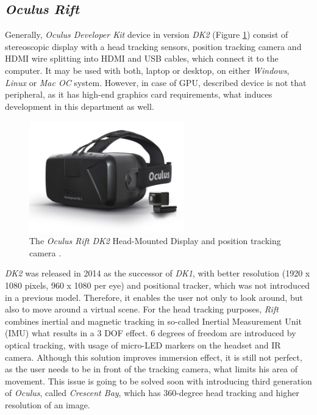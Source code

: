 \subsection{\textit{Oculus Rift}}
Generally, \textit{Oculus Developer Kit} device in version \textit{DK2} (Figure \ref{fig:oculus}) consist of stereoscopic display with a head tracking sensors, position tracking camera and HDMI wire splitting into HDMI and USB cables, which connect it to the computer. It may be used with both, laptop or desktop, on either \textit{Windows}, \textit{Linux} or \textit{Mac OC} system. However, in case of GPU, described device is not that peripheral, as it has high-end graphics card requirements, what induces development in this department as well.
\begin{figure}[h] 
\centering    
\includegraphics[width=0.6\textwidth]{Figs/oculus.jpg}
\caption{The \textit{Oculus Rift DK2} Head-Mounted Display and position tracking camera \cite{Parisi15}.}
\label{fig:oculus}
\end{figure}
\textit{DK2} was released in 2014 as the successor of \textit{DK1}, with better resolution (1920 x 1080 pixels, 960 x 1080 per eye) and positional tracker, which was not introduced in a previous model. Therefore, it enables the user not only to look around, but also to move around a virtual scene.  For the head tracking purposes, \textit{Rift} combines inertial and magnetic tracking in so-called Inertial Measurement Unit (IMU) what results in a 3 DOF effect. 6 degrees of freedom are introduced by optical tracking, with usage of micro-LED markers on the headset and IR camera. Although this solution improves immersion effect, it is still not perfect, as the user needs to be in front of the tracking camera, what limits his area of movement. This issue is  going to be solved soon with introducing third generation of \textit{Oculus}, called \textit{Crescent Bay}, which has 360-degree head tracking and higher resolution of an image. 

